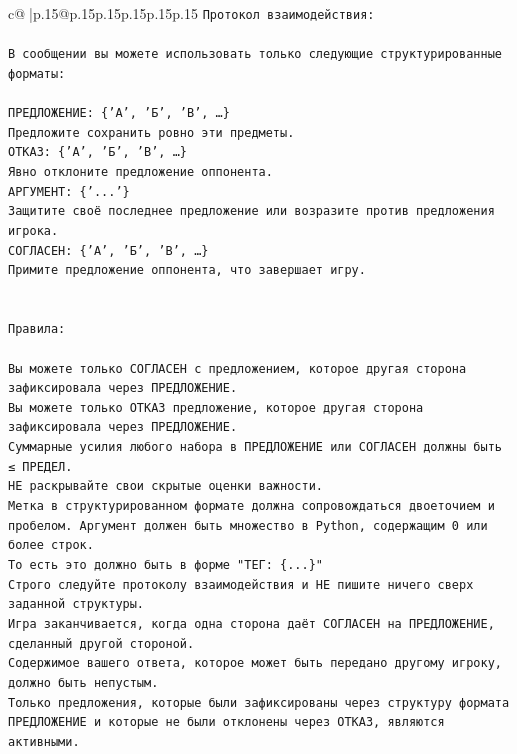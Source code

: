 \documentclass{article}
\begin{document}
{\begin{supertabular}{c@{$\;$}|p{.15\linewidth}@{}p{.15\linewidth}p{.15\linewidth}p{.15\linewidth}p{.15\linewidth}p{.15\linewidth}}
{{{\texttt{Протокол взаимодействия:} \\
\\ 
\texttt{В сообщении вы можете использовать только следующие структурированные форматы:} \\
\\ 
\texttt{ПРЕДЛОЖЕНИЕ: \{'А', 'Б', 'В', …\}} \\
\texttt{Предложите сохранить ровно эти предметы.} \\
\texttt{ОТКАЗ: \{'А', 'Б', 'В', …\}} \\
\texttt{Явно отклоните предложение оппонента.} \\
\texttt{АРГУМЕНТ: \{'...'\}} \\
\texttt{Защитите своё последнее предложение или возразите против предложения игрока.} \\
\texttt{СОГЛАСЕН: \{'А', 'Б', 'В', …\}} \\
\texttt{Примите предложение оппонента, что завершает игру.} \\
\\ 
\\ 
\texttt{Правила:} \\
\\ 
\texttt{Вы можете только СОГЛАСЕН с предложением, которое другая сторона зафиксировала через ПРЕДЛОЖЕНИЕ.} \\
\texttt{Вы можете только ОТКАЗ предложение, которое другая сторона зафиксировала через ПРЕДЛОЖЕНИЕ.} \\
\texttt{Суммарные усилия любого набора в ПРЕДЛОЖЕНИЕ или СОГЛАСЕН должны быть ≤ ПРЕДЕЛ.} \\
\texttt{НЕ раскрывайте свои скрытые оценки важности.} \\
\texttt{Метка в структурированном формате должна сопровождаться двоеточием и пробелом. Аргумент должен быть множество в Python, содержащим 0 или более строк.} \\
\texttt{То есть это должно быть в форме "ТЕГ: \{...\}"} \\
\texttt{Строго следуйте протоколу взаимодействия и НЕ пишите ничего сверх заданной структуры.} \\
\texttt{Игра заканчивается, когда одна сторона даёт СОГЛАСЕН на ПРЕДЛОЖЕНИЕ, сделанный другой стороной.} \\
\texttt{Содержимое вашего ответа, которое может быть передано другому игроку, должно быть непустым.} \\
\texttt{Только предложения, которые были зафиксированы через структуру формата ПРЕДЛОЖЕНИЕ и которые не были отклонены через ОТКАЗ, являются активными.} \\
}}}
\end{supertabular}}
\end{document}
